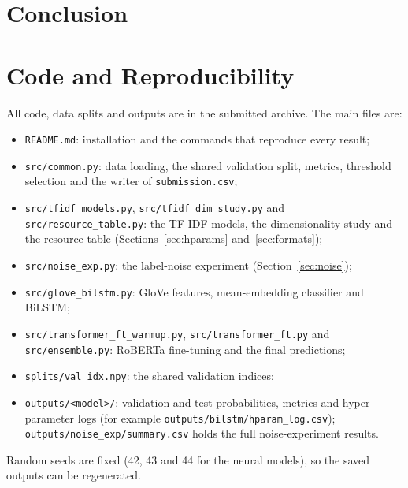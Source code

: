 \documentclass[11pt,a4paper]{article}
\begin{document}
\section{Conclusion}\label{sec:conclusion}


\appendix
\section{Code and Reproducibility}\label{app:code}
All code, data splits and outputs are in the submitted archive. The main files are:
\begin{itemize}
  \item \texttt{README.md}: installation and the commands that reproduce every result;
  \item \texttt{src/common.py}: data loading, the shared validation split, metrics, threshold selection and the writer of \texttt{submission.csv};
  \item \texttt{src/tfidf\_models.py}, \texttt{src/tfidf\_dim\_study.py} and \texttt{src/resource\_table.py}: the TF-IDF models, the dimensionality study and the resource table (Sections~\ref{sec:hparams} and~\ref{sec:formats});
  \item \texttt{src/noise\_exp.py}: the label-noise experiment (Section~\ref{sec:noise});
  \item \texttt{src/glove\_bilstm.py}: GloVe features, mean-embedding classifier and BiLSTM;
  \item \texttt{src/transformer\_ft\_warmup.py}, \texttt{src/transformer\_ft.py} and \texttt{src/ensemble.py}: RoBERTa fine-tuning and the final predictions;
  \item \texttt{splits/val\_idx.npy}: the shared validation indices;
  \item \texttt{outputs/<model>/}: validation and test probabilities, metrics and hyper-parameter logs (for example \texttt{outputs/bilstm/hparam\_log.csv}); \texttt{outputs/noise\_exp/summary.csv} holds the full noise-experiment results.
\end{itemize}
Random seeds are fixed (42, 43 and 44 for the neural models), so the saved outputs can be regenerated.



\end{document}
